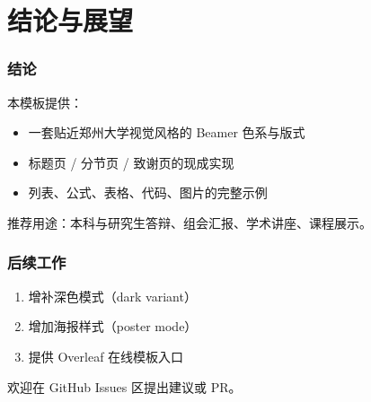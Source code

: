 \section{结论与展望}

\begin{frame}
  \frametitle{结论}
  本模板提供：
  \begin{itemize}
    \item 一套贴近郑州大学视觉风格的 Beamer 色系与版式
    \item 标题页 / 分节页 / 致谢页的现成实现
    \item 列表、公式、表格、代码、图片的完整示例
  \end{itemize}
  \pause
  \vspace{0.6em}
  推荐用途：本科与研究生答辩、组会汇报、学术讲座、课程展示。
\end{frame}

\begin{frame}
  \frametitle{后续工作}
  \begin{enumerate}
    \item 增补深色模式（dark variant）
    \item 增加海报样式（poster mode）
    \item 提供 Overleaf 在线模板入口
  \end{enumerate}
  欢迎在 GitHub Issues 区提出建议或 PR。
\end{frame}
